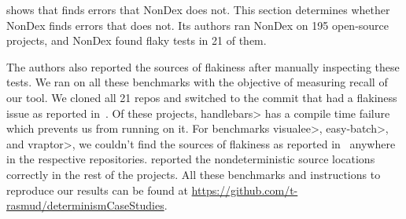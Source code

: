  shows that \ourTool finds errors that NonDex does not.
This section determines whether NonDex finds errors that \ourTool does not.
Its authors ran NonDex on 195 open-source projects, and NonDex found flaky tests in
21 of them.


The authors also reported the sources of flakiness
after manually inspecting these tests. We ran \TheDeterminismChecker on all these benchmarks with the objective
of measuring recall of our tool. We cloned all 21 repos and switched to the commit that had a flakiness issue as reported 
in~\cite{nondex}. Of these projects, \<handlebars> has a compile time failure which prevents us from running \TheDeterminismChecker on it. For benchmarks \<visualee>, \<easy-batch>, and \<vraptor>, we couldn't find
the sources of flakiness as reported in~\cite{nondex} anywhere in the respective repositories.
\TheDeterminismChecker reported the nondeterministic source locations correctly in the rest of the projects.
All these benchmarks and instructions to reproduce our results can be found at \href{https://github.com/t-rasmud/determinismCaseStudies}{https://github.com/t-rasmud/determinismCaseStudies}.

